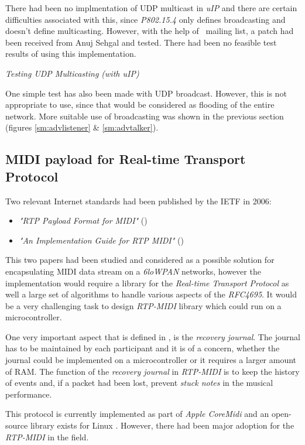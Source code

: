   There had been no implmentation of UDP multicast in \emph{uIP} and there 
 are certain difficulties associated with this, since \emph{P802.15.4}
 only defines broadcasting and doesn't define multicasting. However,
 with the help of \Contiki\ mailing list, a patch had been received from
 Anuj Sehgal and tested. There had been no feasible test results of using
 this implementation.

 \TrackerList\em
  Testing UDP Multicasting (with uIP)
 \TrackerEnd

  One simple test has also been made with UDP broadcast. However, this
  is not appropriate to use, since that would be considered as flooding
  of the entire network. More suitable use of broadcasting was shown in
  the  previous section (figures \ref{sm:advlistener} \& \ref{sm:advtalker}).


\subsection{MIDI payload for Real-time Transport Protocol}

 Two relevant Internet standards had been published by the IETF in 2006:
 \begin{itemize}
  \item\emph{"RTP Payload Format for MIDI"} ()
  \item\emph{"An Implementation Guide for RTP MIDI"} ()
 \end{itemize}

 This two papers had been studied and considered as a possible solution
 for encapsulating MIDI data stream on a \emph{6loWPAN} networks, however
 the implementation would require a library for the \emph{Real-time
 Transport Protocol} as well a large set of algorithms to handle various
 aspects of the \emph{RFC4695}. It would be a very challenging task to
 design \emph{RTP-MIDI} library which could run on a microcontroller.

  One very important aspect that is defined in , is the
 \emph{recovery journal}. The journal has to be maintained by each
 participant and it is of a concern, whether the journal could be
 implemented on a microcontroller or it requires a larger amount
 of RAM. The function of the \emph{recovery journal} in \emph{RTP-MIDI}
 is to keep the history of events and, if a packet had been lost, prevent
 \emph{stuck notes} in the musical performance.
 
 This protocol is currently implemented as part of \emph{Apple CoreMidi}
 \cite{links:wiki:rtpmidi} and an open-source library exists for Linux
 \cite{links:rtpmidi}. However, there had been major adoption for the
 \emph{RTP-MIDI} in the field.

